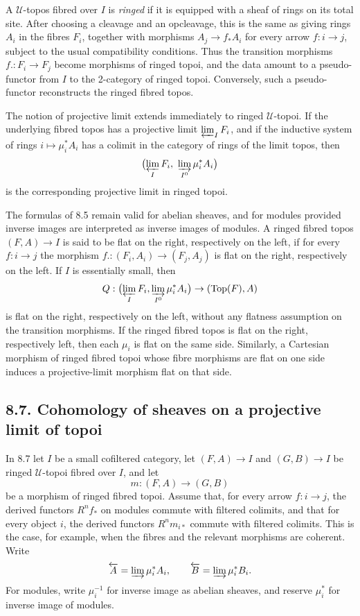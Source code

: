 \documentclass[11pt]{article}
\newcommand{\U}{\mathcal{U}}
\newcommand{\Top}{\operatorname{Top}}
\begin{document}
A \(\U\)-topos fibred over \(I\) is \emph{ringed} if it is equipped with a sheaf of rings on its total site. After choosing a cleavage and an opcleavage, this is the same as giving rings \(A_i\) in the fibres \(F_i\), together with morphisms \(A_j\to f_*A_i\) for every arrow \(f:i\to j\), subject to the usual compatibility conditions. Thus the transition morphisms \(f.:F_i\to F_j\) become morphisms of ringed topoi, and the data amount to a pseudo-functor from \(I\) to the 2-category of ringed topoi. Conversely, such a pseudo-functor reconstructs the ringed fibred topos.

The notion of projective limit extends immediately to ringed \(\U\)-topoi. If the underlying fibred topos has a projective limit \(\varprojlim_I F_i\), and if the inductive system of rings \(i\mapsto\mu_i^*A_i\) has a colimit in the category of rings of the limit topos, then
\[
 \bigl(\varprojlim_I F_i,\ \varinjlim_{I^0}\mu_i^*A_i\bigr)
\]
is the corresponding projective limit in ringed topoi.

The formulas of 8.5 remain valid for abelian sheaves, and for modules provided inverse images are interpreted as inverse images of modules. A ringed fibred topos \((F,A)\to I\) is said to be flat on the right, respectively on the left, if for every \(f:i\to j\) the morphism \(f.:(F_i,A_i)\to(F_j,A_j)\) is flat on the right, respectively on the left. If \(I\) is essentially small, then
\[
 Q:\bigl(\varprojlim_I F_i,\varinjlim_{I^0}\mu_i^*A_i\bigr)\to
 (\Top(F),A)
\]
is flat on the right, respectively on the left, without any flatness assumption on the transition morphisms. If the ringed fibred topos is flat on the right, respectively left, then each \(\mu_i\) is flat on the same side. Similarly, a Cartesian morphism of ringed fibred topoi whose fibre morphisms are flat on one side induces a projective-limit morphism flat on that side.

\subsection*{8.7. Cohomology of sheaves on a projective limit of topoi}

In 8.7 let \(I\) be a small cofiltered category, let \((F,A)\to I\) and \((G,B)\to I\) be ringed \(\U\)-topoi fibred over \(I\), and let
\[
 m:(F,A)\to(G,B)
\]
be a morphism of ringed fibred topoi. Assume that, for every arrow \(f:i\to j\), the derived functors \(R^nf_*\) on modules commute with filtered colimits, and that for every object \(i\), the derived functors \(R^nm_{i*}\) commute with filtered colimits. This is the case, for example, when the fibres and the relevant morphisms are coherent. Write
\[
 \overleftarrow A=\varinjlim\mu_i^*A_i,
 \qquad
 \overleftarrow B=\varinjlim\mu_i^*B_i.
\]
For modules, write \(\mu_i^{-1}\) for inverse image as abelian sheaves, and reserve \(\mu_i^*\) for inverse image of modules.
\end{document}
